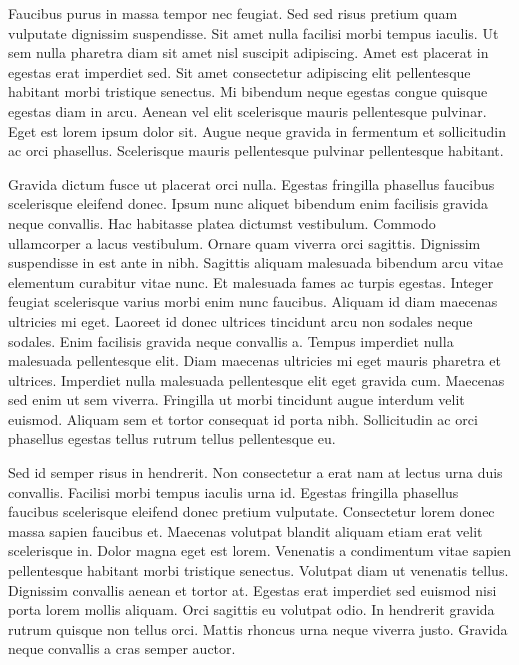 \documentclass[11pt,a4paper]{article}
\begin{document}
Faucibus purus in massa tempor nec feugiat. Sed sed risus pretium quam vulputate dignissim suspendisse. Sit amet nulla facilisi morbi tempus iaculis. Ut sem nulla pharetra diam sit amet nisl suscipit adipiscing. Amet est placerat in egestas erat imperdiet sed. Sit amet consectetur adipiscing elit pellentesque habitant morbi tristique senectus. Mi bibendum neque egestas congue quisque egestas diam in arcu. Aenean vel elit scelerisque mauris pellentesque pulvinar. Eget est lorem ipsum dolor sit. Augue neque gravida in fermentum et sollicitudin ac orci phasellus. Scelerisque mauris pellentesque pulvinar pellentesque habitant.

Gravida dictum fusce ut placerat orci nulla. Egestas fringilla phasellus faucibus scelerisque eleifend donec. Ipsum nunc aliquet bibendum enim facilisis gravida neque convallis. Hac habitasse platea dictumst vestibulum. Commodo ullamcorper a lacus vestibulum. Ornare quam viverra orci sagittis. Dignissim suspendisse in est ante in nibh. Sagittis aliquam malesuada bibendum arcu vitae elementum curabitur vitae nunc. Et malesuada fames ac turpis egestas. Integer feugiat scelerisque varius morbi enim nunc faucibus. Aliquam id diam maecenas ultricies mi eget. Laoreet id donec ultrices tincidunt arcu non sodales neque sodales. Enim facilisis gravida neque convallis a. Tempus imperdiet nulla malesuada pellentesque elit. Diam maecenas ultricies mi eget mauris pharetra et ultrices. Imperdiet nulla malesuada pellentesque elit eget gravida cum. Maecenas sed enim ut sem viverra. Fringilla ut morbi tincidunt augue interdum velit euismod. Aliquam sem et tortor consequat id porta nibh. Sollicitudin ac orci phasellus egestas tellus rutrum tellus pellentesque eu.

Sed id semper risus in hendrerit. Non consectetur a erat nam at lectus urna duis convallis. Facilisi morbi tempus iaculis urna id. Egestas fringilla phasellus faucibus scelerisque eleifend donec pretium vulputate. Consectetur lorem donec massa sapien faucibus et. Maecenas volutpat blandit aliquam etiam erat velit scelerisque in. Dolor magna eget est lorem. Venenatis a condimentum vitae sapien pellentesque habitant morbi tristique senectus. Volutpat diam ut venenatis tellus. Dignissim convallis aenean et tortor at. Egestas erat imperdiet sed euismod nisi porta lorem mollis aliquam. Orci sagittis eu volutpat odio. In hendrerit gravida rutrum quisque non tellus orci. Mattis rhoncus urna neque viverra justo. Gravida neque convallis a cras semper auctor.
\end{document}
